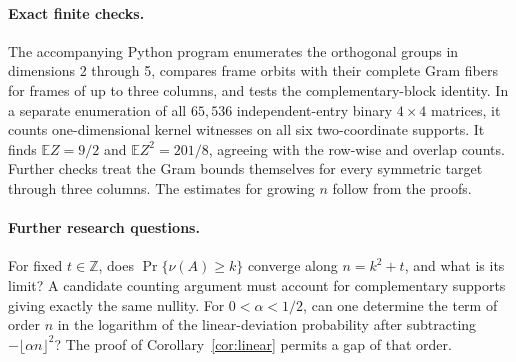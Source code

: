 \documentclass[11pt]{article}
\theoremstyle{remark}\newtheorem*{remark}{Remark}
\begin{document}
\paragraph{Exact finite checks.}
The accompanying Python program enumerates the orthogonal groups in dimensions 2 through 5, compares frame orbits with their complete Gram fibers for frames of up to three columns, and tests the complementary-block identity. In a separate enumeration of all $65{,}536$ independent-entry binary $4\times4$ matrices, it counts one-dimensional kernel witnesses on all six two-coordinate supports. It finds $\mathbb E Z=9/2$ and $\mathbb E Z^2=201/8$, agreeing with the row-wise and overlap counts. Further checks treat the Gram bounds themselves for every symmetric target through three columns. The estimates for growing $n$ follow from the proofs.

\paragraph{Further research questions.}
For fixed $t\in\mathbb Z$, does $\Pr\{\nu(A)\ge k\}$ converge along $n=k^2+t$, and what is its limit? A candidate counting argument must account for complementary supports giving exactly the same nullity. For $0<\alpha<1/2$, can one determine the term of order $n$ in the logarithm of the linear-deviation probability after subtracting $-\lfloor\alpha n\rfloor^2$? The proof of Corollary~\ref{cor:linear} permits a gap of that order.
\end{document}
